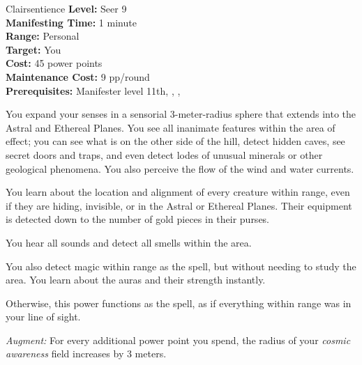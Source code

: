 {Clairsentience}
{
	\textbf{Level:}
	Seer 9\\
	\textbf{Manifesting Time:}
	1 minute\\
	\textbf{Range:}
	Personal\\
	\textbf{Target:}
	You\\
	\textbf{Cost:}
	45 power points\\
	\textbf{Maintenance Cost:}
	9 pp/round\\
	\textbf{Prerequisites:}
	Manifester level 11th, , , \\
}
{
	You expand your senses in a sensorial 3-meter-radius sphere that extends into the Astral and Ethereal Planes. You see all inanimate features within the area of effect; you can see what is on the other side of the hill, detect hidden caves, see secret doors and traps, and even detect lodes of unusual minerals or other geological phenomena. You also perceive the flow of the wind and water currents.

	You learn about the location and alignment of every creature within range, even if they are hiding, invisible, or in the Astral or Ethereal Planes. Their equipment is detected down to the number of gold pieces in their purses.

	You hear all sounds and detect all smells within the area.

	You also detect magic within range as the  spell, but without needing to study the area. You learn about the auras and their strength instantly.

	Otherwise, this power functions as the  spell, as if everything within range was in your line of sight.

	\textit{Augment:} For every additional power point you spend, the radius of your \emph{cosmic awareness} field increases by 3 meters.
}